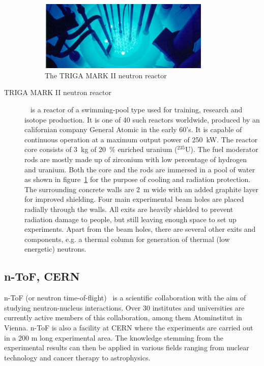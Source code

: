 \documentclass[twoside,12pt]{packages/mytustyle}  %
\begin{document}
\begin{description}
\begin{figure}[!t]
\centering
\includegraphics[width=0.8\textwidth]{pics/triga}
\caption{The TRIGA MARK II neutron reactor \cite{GeneralAtomics}}
\label{fig:triga}
\end{figure}
\item[TRIGA MARK II neutron reactor]~\cite{Triga:00000} is a reactor of a swimming-pool type used for training, research and isotope production. It is one of 40 such reactors worldwide, produced by an californian company General Atomic in the early 60's. It is capable of continuous operation at a maximum output power of 250~kW. 
The reactor core consists of 3~kg of 20~\% enriched uranium ($^{235}$U). The fuel moderator rods are mostly made up of zirconium with low percentage of hydrogen and uranium. Both the core and the rods are immersed in a pool of water as shown in figure~\ref{fig:triga} for the purpose of cooling and radiation protection. The surrounding concrete walls are 2~m wide with an added graphite layer for improved shielding. Four main experimental beam holes are placed radially through the walls. All exits are heavily shielded to prevent radiation damage to people, but still leaving enough space to set up experiments. Apart from the beam holes, there are several other exits and components, e.g. a thermal column for generation of thermal (low energetic) neutrons.


\end{description}




\subsection{n-ToF, CERN}
n-ToF (or neutron time-of-flight)~\cite{NTOF:00000} is a scientific collaboration with the aim of studying neutron-nucleus interactions. Over 30 institutes and universities are currently active members of this collaboration, among them Atominstitut in Vienna. n-ToF is also a facility at CERN where the experiments are carried out in a 200 m long experimental area. The knowledge stemming from the experimental results can then be applied in various fields ranging from nuclear technology and cancer therapy to astrophysics.
\end{document}
